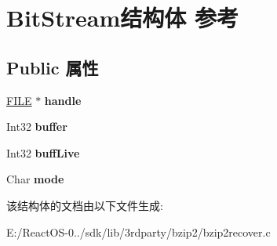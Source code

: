 \hypertarget{struct_bit_stream}{}\section{Bit\+Stream结构体 参考}
\label{struct_bit_stream}
\subsection*{Public 属性}
\begin{DoxyCompactItemize}
\item 
\mbox{\label{struct_bit_stream_a956fee2244b6911cd9d9f9d75d60a9a7}} 
\hyperlink{struct__iobuf}{F\+I\+LE} $\ast$ {\bfseries handle}
\item 
\mbox{\label{struct_bit_stream_a44b9819338efc572dda889f48bf0bcdb}} 
Int32 {\bfseries buffer}
\item 
\mbox{\label{struct_bit_stream_a0d8a427f988b0457fd82000bfbdaa341}} 
Int32 {\bfseries buff\+Live}
\item 
\mbox{\label{struct_bit_stream_abca99d84aadde3a1078aa2bc9ba88659}} 
Char {\bfseries mode}
\end{DoxyCompactItemize}


该结构体的文档由以下文件生成\+:\begin{DoxyCompactItemize}
\item 
E\+:/\+React\+O\+S-\/0../sdk/lib/3rdparty/bzip2/bzip2recover.\+c\end{DoxyCompactItemize}
